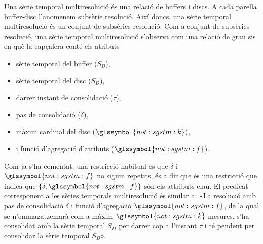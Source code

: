 Una sèrie temporal multiresolució és una
relació de buffers i discs. A cada parella buffer-disc l'anomenem
subsèrie resolució. Així doncs, una sèrie temporal multiresolució és
un conjunt de subsèries resolució.
Com a conjunt de subsèries resolució, una sèrie temporal multiresolució
s'observa com una relació de grau sis en què la capçalera conté els
atributs
\begin{itemize}
\item sèrie temporal del buffer ($S_B$),
\item sèrie temporal del disc ($S_D$),
\item darrer instant de consolidació ($\tau$),
\item pas de consolidació ($\delta$),
\item màxim cardinal del disc ($\glssymbol{not:sgstm:k}$),
\item i funció d'agregació d'atributs ($\glssymbol{not:sgstm:f}$).
\end{itemize}



Com ja s'ha comentat, una restricció habitual és que $\delta$ i
$\glssymbol{not:sgstm:f}$ no siguin repetits, és a dir que és una
restricció que indica que $\{\delta,\glssymbol{not:sgstm:f}\}$ són els
attributs clau.  El predicat corresponent a les sèries temporals
multiresolució és similar a: «La resolució amb pas de consolidació
\emph{$\delta$} i funció d'agregació \emph{$\glssymbol{not:sgstm:f}$},
de la qual se n'emmagatzemarà com a màxim
\emph{$\glssymbol{not:sgstm:k}$} mesures, s'ha consolidat amb la sèrie
temporal \emph{$S_D$} per darrer cop a l'instant \emph{$\tau$} i té
pendent per consolidar la sèrie temporal \emph{$S_B$}».



